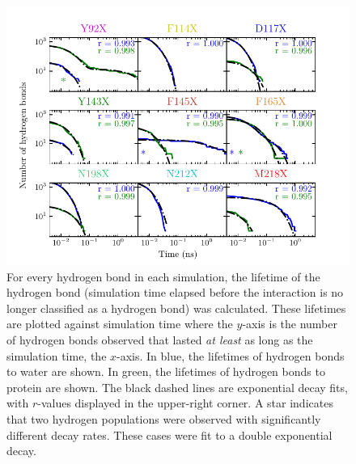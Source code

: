 \begin{figure}
    \center
    \includegraphics[width=\double]{figures-gfp-hbond/Lifetime_hbonds.pdf}
    \caption[Residence lifetimes of observed hydrogen bonds]{
        For every hydrogen bond in each simulation, the lifetime of the hydrogen bond (simulation time elapsed before the interaction is no longer classified as a hydrogen bond) was calculated. 
        These lifetimes are plotted against simulation time where the $y$-axis is the number of hydrogen bonds observed that lasted \emph{at least} as long as the simulation time, the $x$-axis. 
        In blue, the lifetimes of hydrogen bonds to water are shown. 
        In green, the lifetimes of hydrogen bonds to protein are shown. 
        The black dashed lines are exponential decay fits, with $r$-values displayed in the upper-right corner. 
        A star indicates that two hydrogen populations were observed with significantly different decay rates. 
        These cases were fit to a double exponential decay.
    }
    \label{fig:hbond-lifetimes}
\end{figure}

